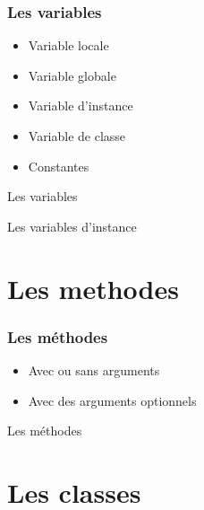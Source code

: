 \documentclass{beamer}
\begin{document}
\begin{frame}
  \frametitle{Les variables}
  \begin{itemize}
    \item Variable locale
    \item Variable globale
    \item Variable d'instance
    \item Variable de classe
    \item Constantes
  \end{itemize}
\end{frame}

\begin{frame}
  \begin{beamerboxesrounded}{Les variables}
    
  \end{beamerboxesrounded}
\end{frame}

\begin{frame}
  \begin{beamerboxesrounded}{Les variables d'instance}
    
  \end{beamerboxesrounded}
\end{frame}


\section{Les methodes}

\begin{frame}
  \frametitle{Les m\'ethodes}
  \begin{itemize}
    \item Avec ou sans arguments
    \item Avec des arguments optionnels
  \end{itemize}
\end{frame}

\begin{frame}
  \begin{beamerboxesrounded}{Les m\'ethodes}
    
  \end{beamerboxesrounded}
\end{frame}

\section{Les classes}
\end{document}
